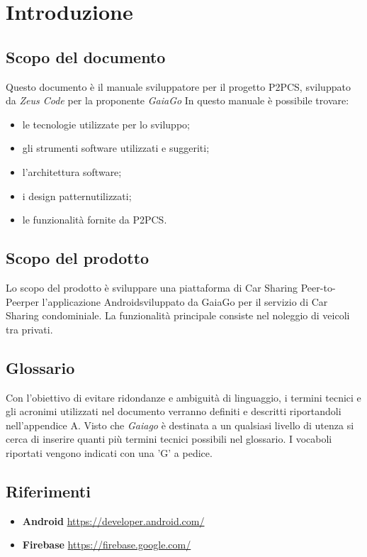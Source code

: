 \section{Introduzione} 
\subsection{Scopo del documento}
Questo documento è il manuale sviluppatore per il progetto P2PCS, sviluppato da \textit{Zeus Code} per la proponente \textit{GaiaGo}
In questo manuale è possibile trovare:
\begin{itemize}
	\item le tecnologie utilizzate per lo sviluppo;
	\item gli strumenti software utilizzati e suggeriti;
	\item l'architettura software;
	\item i design pattern\glosp utilizzati;
	\item le funzionalità fornite da P2PCS.
\end{itemize}
\subsection{Scopo del prodotto}
Lo scopo del prodotto è sviluppare una piattaforma di Car Sharing Peer-to-Peer\glosp per l'applicazione Android\glosp sviluppato da GaiaGo per il servizio di Car Sharing condominiale. La funzionalità principale consiste nel noleggio di veicoli tra privati.
\subsection{Glossario}
Con l'obiettivo di evitare ridondanze e ambiguità di linguaggio, i termini tecnici e gli acronimi
utilizzati nel documento verranno definiti e descritti riportandoli nell'appendice A.
Visto che \textit{Gaiago} è destinata a un qualsiasi livello di utenza si cerca di inserire quanti più termini tecnici possibili nel glossario.
I vocaboli riportati vengono indicati con una 'G' a pedice.
\subsection{Riferimenti}
\begin{itemize}
	\item \textbf{Android} \url{https://developer.android.com/}
	\item \textbf{Firebase} \url{https://firebase.google.com/}	
\end{itemize}